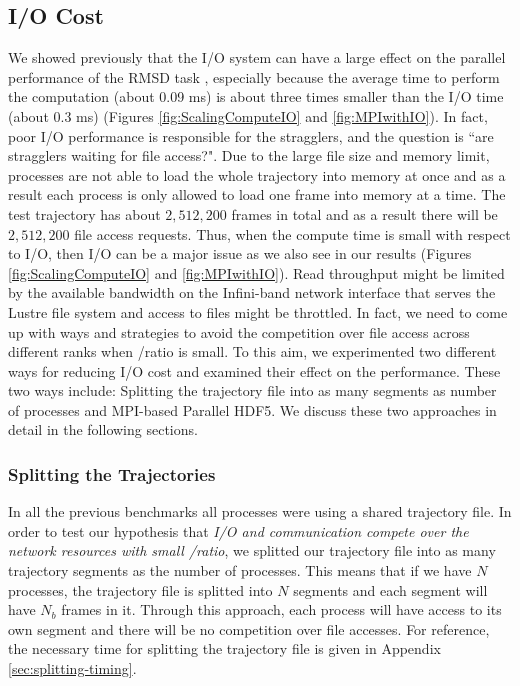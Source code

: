 \subsection{I/O Cost}
\label{I/O}
We showed previously that the I/O system can have a large effect on the parallel performance of the RMSD task \cite{Khoshlessan:2017ab},
especially because the average time to perform the computation \tcomp (about 0.09 ms) is about three times smaller than the I/O time \tIO (about 0.3 ms) (Figures \ref{fig:ScalingComputeIO} and \ref{fig:MPIwithIO}). 
In fact, poor I/O performance is responsible for the stragglers, and the question is ``are stragglers waiting for file access?". 
Due to the large file size and memory limit, processes are not able to load the whole trajectory into memory at once and as a result each process is only allowed to load one frame into memory at a time.
The test trajectory has about $2,512,200$ frames in total and as a result there will be $2,512,200$ file access requests. 
Thus, when the compute time is small with respect to I/O, then I/O can be a major issue as we also see in our results (Figures \ref{fig:ScalingComputeIO} and \ref{fig:MPIwithIO}).    
Read throughput might be limited by the available bandwidth on the Infini-band network interface that serves the Lustre file system and access to files might be throttled.
In fact, we need to come up with ways and strategies to avoid the competition over file access across different ranks when \tcomp/\tIO ratio is small.
To this aim, we experimented two different ways for reducing I/O cost and examined their effect on the performance.
These two ways include: Splitting the trajectory file into as many segments as number of processes and MPI-based Parallel HDF5.
We discuss these two approaches in detail in the following sections.

\subsubsection{Splitting the Trajectories}
\label{Splitting}
In all the previous benchmarks all processes were using a shared trajectory file.
In order to test our hypothesis that \emph{I/O and communication compete over the network resources with small \tcomp/\tIO ratio}, we splitted our trajectory file into as many trajectory segments as the number of processes.
This means that if we have $N$ processes, the trajectory file is splitted into $N$ segments and each segment will have $N_{b}$ frames in it. 
Through this approach, each process will have access to its own segment and there will be no competition over file accesses. 
For reference, the necessary time for splitting the trajectory file is given in Appendix \ref{sec:splitting-timing}.

